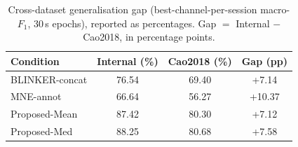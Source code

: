 \begin{table}[ht]
  \centering
  \caption{Cross-dataset generalisation gap (best-channel-per-session macro-$F_1$, 30\,s epochs), reported as percentages. Gap $=$ Internal $-$ Cao2018, in percentage points.}
  \label{tab:cross_dataset_gap}
  \begin{tabular}{lccc}
    \toprule
    Condition & Internal (\%) & Cao2018 (\%) & Gap (pp) \\
    \midrule
    BLINKER-concat & 76.54 & 69.40 & +7.14 \\
    MNE-annot & 66.64 & 56.27 & +10.37 \\
    Proposed-Mean & 87.42 & 80.30 & +7.12 \\
    Proposed-Med & 88.25 & 80.68 & +7.58 \\
    \bottomrule
  \end{tabular}
\end{table}
